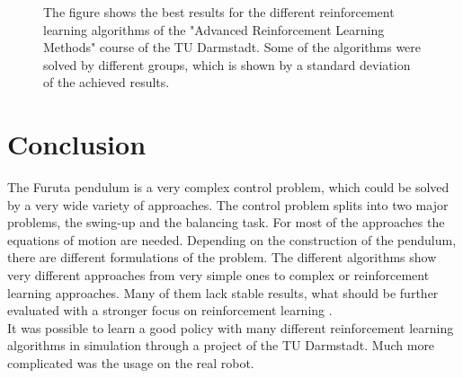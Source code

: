  \begin{figure}[h]
 	\centering
	\scalebox{.4}{}
	\caption{The figure shows the best results for the different reinforcement 
	learning algorithms of the "Advanced Reinforcement Learning Methods" 
	course 
	of the TU Darmstadt. Some of the algorithms were solved by different 
	groups, which is shown by a standard deviation of the achieved results.}
	\label{fig:rewards}
\end{figure}



\section{Conclusion}
The Furuta pendulum is a very complex control problem, which could be solved by 
a very wide variety of approaches. The control problem splits into two major 
problems, the swing-up and the balancing task. For most of the approaches the 
equations of motion are needed. Depending on the construction of the pendulum, 
there are different formulations of the problem. The different algorithms show 
very different approaches from very simple ones to complex or reinforcement 
learning approaches. Many of them lack stable results, what should be further 
evaluated with a stronger focus on
reinforcement learning \citep{wang2004minimum}.\\
It was possible to learn a good policy with many different reinforcement 
learning algorithms in simulation through a project of the TU Darmstadt. Much 
more complicated was the usage on the real robot.







